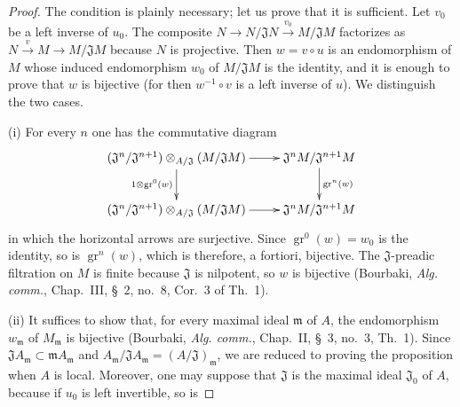 \begin{proof}
The condition is plainly necessary; let us prove that it is sufficient.
Let $v_0$ be a left inverse of $u_0$.
The composite $N\to N/\mathfrak JN\xrightarrow{v_0}M/\mathfrak JM$ factorizes as $N\xrightarrow{v}M\to M/\mathfrak JM$ because $N$ is projective.
Then $w=v\circ u$ is an endomorphism of $M$ whose induced endomorphism $w_0$ of $M/\mathfrak JM$ is the identity, and it is enough to prove that $w$ is bijective (for then $w^{-1}\circ v$ is a left inverse of $u$).
We distinguish the two cases.

(i) For every $n$ one has the commutative diagram
\[
  \xymatrix{
    (\mathfrak J^n/\mathfrak J^{n+1})\otimes_{A/\mathfrak J}
      (M/\mathfrak JM)\ar[r]\ar[d]_{1\otimes\operatorname{gr}^0(w)} &
      \mathfrak J^nM/\mathfrak J^{n+1}M\ar[d]^{\operatorname{gr}^n(w)}\\
    (\mathfrak J^n/\mathfrak J^{n+1})\otimes_{A/\mathfrak J}
      (M/\mathfrak JM)\ar[r] & \mathfrak J^nM/\mathfrak J^{n+1}M
  }
\]
in which the horizontal arrows are surjective.
Since $\operatorname{gr}^0(w)=w_0$ is the identity, so is $\operatorname{gr}^n(w)$, which is therefore, a fortiori, bijective.
The $\mathfrak J$-preadic filtration on $M$ is finite because $\mathfrak J$ is nilpotent, so $w$ is bijective (Bourbaki, \emph{Alg. comm.}, Chap.~III, \S~2, no.~8, Cor.~3 of Th.~1).

(ii) It suffices to show that, for every maximal ideal $\mathfrak m$ of $A$, the endomorphism $w_{\mathfrak m}$ of $M_{\mathfrak m}$ is bijective (Bourbaki, \emph{Alg. comm.}, Chap.~II, \S~3, no.~3, Th.~1).
Since $\mathfrak JA_{\mathfrak m}\subset\mathfrak mA_{\mathfrak m}$ and
$A_{\mathfrak m}/\mathfrak JA_{\mathfrak m}=(A/\mathfrak J)_{\mathfrak m}$, we are reduced to proving the proposition when $A$ is local.
Moreover, one may suppose that $\mathfrak J$ is the maximal ideal $\mathfrak J_0$ of $A$, because if $u_0$ is left invertible, so is



\end{proof}

